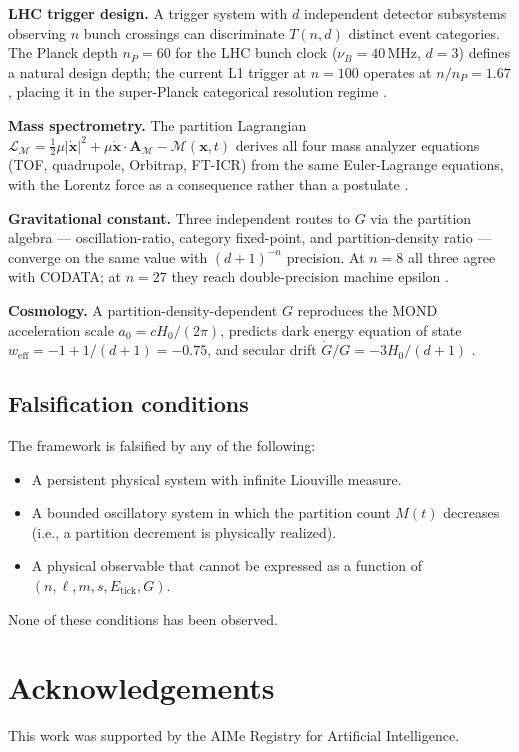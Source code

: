 \documentclass[twocolumn,10pt,a4paper]{article}
\theoremstyle{thmstyle}
\theoremstyle{definition}
\theoremstyle{remark}
\begin{document}
\textbf{LHC trigger design.} A trigger system with $d$ independent detector
subsystems observing $n$ bunch crossings can discriminate $T(n,d)$ distinct
event categories. The Planck depth $n_P = 60$ for the LHC bunch clock
($\nu_B = 40\,\mathrm{MHz}$, $d = 3$) defines a natural design depth;
the current L1 trigger at $n = 100$ operates at $n/n_P = 1.67$,
placing it in the super-Planck categorical resolution regime
\citep{companion:fundamentaltiming,companion:planckdepth}.

\textbf{Mass spectrometry.} The partition Lagrangian
$\mathcal{L}_\mathcal{M} = \frac{1}{2}\mu|\dot{\mathbf{x}}|^2 +
\mu\dot{\mathbf{x}}\cdot\mathbf{A}_\mathcal{M} - \mathcal{M}(\mathbf{x},t)$
derives all four mass analyzer equations (TOF, quadrupole, Orbitrap, FT-ICR)
from the same Euler-Lagrange equations, with the Lorentz force as a
consequence rather than a postulate \citep{companion:ion}.

\textbf{Gravitational constant.} Three independent routes to $G$ via the
partition algebra — oscillation-ratio, category fixed-point, and
partition-density ratio — converge on the same value with
$(d+1)^{-n}$ precision. At $n = 8$ all three agree with CODATA;
at $n = 27$ they reach double-precision machine epsilon
\citep{companion:G}.

\textbf{Cosmology.} A partition-density-dependent $G$ reproduces the MOND
acceleration scale $a_0 = cH_0/(2\pi)$, predicts dark energy equation of state
$w_{\mathrm{eff}} = -1 + 1/(d+1) = -0.75$, and secular drift
$\dot G/G = -3H_0/(d+1)$ \citep{companion:cosmology}.

\subsection{Falsification conditions}

The framework is falsified by any of the following:
\begin{itemize}[nosep]
\item A persistent physical system with infinite Liouville measure.
\item A bounded oscillatory system in which the partition count $M(t)$
decreases (i.e., a partition decrement is physically realized).
\item A physical observable that cannot be expressed as a function of
$(n,\ell,m,s,E_{\mathrm{tick}},G)$.
\end{itemize}
None of these conditions has been observed.

\section*{Acknowledgements}
This work was supported by the AIMe Registry for Artificial Intelligence.



\end{document}
